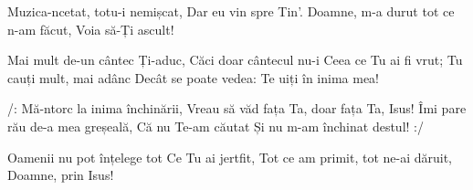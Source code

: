 \beginverse
Muzica-ncetat, totu-i nemișcat,
Dar eu vin spre Tin’.
Doamne, m-a durut tot ce n-am făcut,
Voia să-Ți ascult!
\endverse

\beginverse*
Mai mult de-un cântec Ți-aduc,
Căci doar cântecul nu-i
Ceea ce Tu ai fi vrut;
Tu cauți mult, mai adânc
Decât se poate vedea:
Te uiți în inima mea!
\endverse

\beginchorus
/: Mă-ntorc la inima închinării,
Vreau să văd fața Ta, doar fața Ta, Isus!
Îmi pare rău de-a mea greșeală,
Că nu Te-am căutat
Și nu m-am închinat destul! :/
\endchorus

\beginverse
Oamenii nu pot înțelege tot
Ce Tu ai jertfit,
Tot ce am primit, tot ne-ai dăruit,
Doamne, prin Isus!
\endverse
\endsong